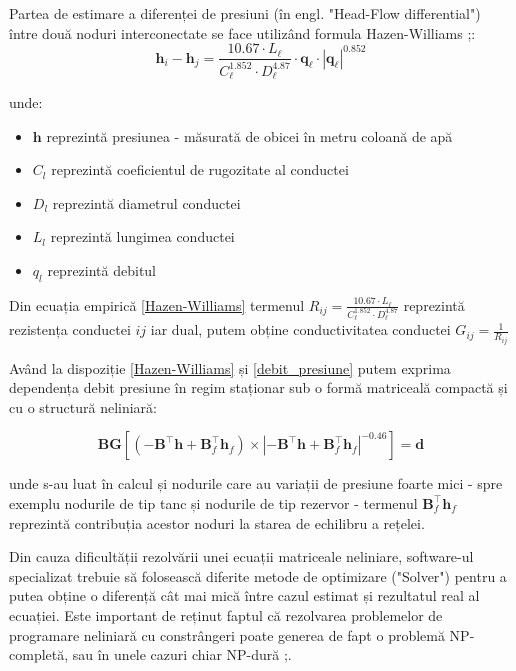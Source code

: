 Partea de estimare a diferenței de presiuni (în engl. "Head-Flow differential") între două noduri interconectate se face utilizând formula Hazen-Williams ;\cite{sanz2016demand}:
\begin{equation}
\label{debit_presiune}
\mathbf h_i-\mathbf h_j=\frac{10.67\cdot L_\ell}{C_\ell^{1.852}\cdot D_\ell^{4.87}}\cdot \mathbf q_\ell\cdot |\mathbf q_\ell|^{0.852}
\end{equation}

unde:
\begin{itemize}
\label{Hazen-Williams}
\item $\textbf{h}$ reprezintă presiunea - măsurată de obicei în metru coloană de apă
\item $C_l$  reprezintă coeficientul de rugozitate al conductei
\item $D_l$ reprezintă diametrul conductei
\item $L_l$ reprezintă lungimea conductei
\item $q_l$ reprezintă debitul
\end{itemize}

Din ecuația empirică \eqref{Hazen-Williams} termenul $R_{ij}=\frac{10.67\cdot L_\ell}{C_\ell^{1.852}\cdot D_\ell^{4.87}}$ reprezintă rezistența conductei $ij$ iar dual, putem obține conductivitatea conductei $G_{ij} = \frac{1}{R_{ij}}$

Având la dispoziție \eqref{Hazen-Williams} și \eqref{debit_presiune} putem exprima dependența debit presiune în regim staționar sub o formă matriceală compactă și cu o structură neliniară:

\begin{equation}
\mathbf B\mathbf G\left[\left(-\mathbf B^\top \mathbf h+\mathbf B_f^\top \mathbf h_f\right)\times \left|-\mathbf B^\top \mathbf h+\mathbf B_f^\top \mathbf h_f\right|^{-0.46}\right]=\mathbf d
\end{equation}

unde s-au luat în calcul și nodurile care au variații de presiune foarte mici - spre exemplu nodurile de tip tanc și  nodurile de tip rezervor - termenul $\mathbf B_f^\top \mathbf h_f$ reprezintă contribuția acestor noduri la starea de echilibru a rețelei.

Din cauza dificultății rezolvării unei ecuații matriceale neliniare, software-ul specializat trebuie să folosească diferite metode de optimizare ("Solver") pentru a putea obține o diferență cât mai mică între cazul estimat și rezultatul real al ecuației. Este important de reținut faptul că rezolvarea problemelor de programare neliniară cu constrângeri poate generea de fapt o problemă NP-completă, sau în unele cazuri chiar NP-dură ;\cite{karp1975computational}.

